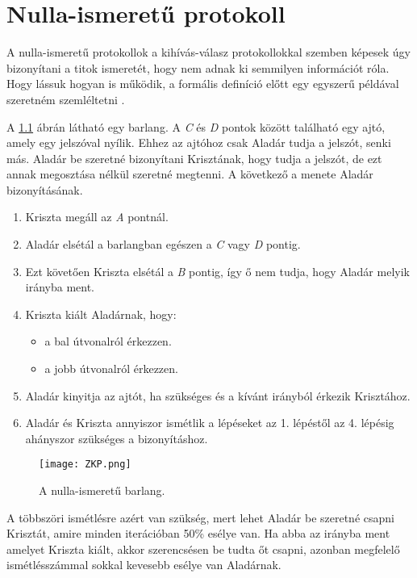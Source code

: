 \chapter{Nulla-ismeretű protokoll}

A nulla-ismeretű protokollok a kihívás-válasz protokollokkal szemben képesek úgy bizonyítani a titok ismeretét, hogy nem adnak ki semmilyen információt róla. Hogy lássuk hogyan is működik, a formális definíció előtt egy egyszerű példával szeretném szemléltetni \cite{ZKPToYourChildren, schneier2015applied}.

A \ref{Figure::ZKcave} ábrán látható egy barlang. A \textit{C} és \textit{D} pontok között található egy ajtó, amely egy jelszóval nyílik. Ehhez az ajtóhoz csak Aladár tudja a jelszót, senki más. Aladár be szeretné bizonyítani Krisztának, hogy tudja a jelszót, de ezt annak megosztása nélkül szeretné megtenni. A következő a menete Aladár bizonyításának.

\begin{enumerate}
    \item Kriszta megáll az \textit{A} pontnál.
    \item Aladár elsétál a barlangban egészen a \textit{C} vagy \textit{D} pontig.
    \item Ezt követően Kriszta elsétál a \textit{B} pontig, így ő nem tudja, hogy Aladár melyik irányba ment.
    \item Kriszta kiált Aladárnak, hogy:
        \begin{itemize}
            \item a bal útvonalról érkezzen.
            \item a jobb útvonalról érkezzen.
        \end{itemize}
    \item Aladár kinyitja az ajtót, ha szükséges és a kívánt irányból érkezik Krisztához.
    \item Aladár és Kriszta annyiszor ismétlik a lépéseket az 1. lépéstől az 4. lépésig ahányszor szükséges a bizonyításhoz.
\end{enumerate}

\begin{figure}[H]
    \centering
    \texttt{[image: ZKP.png]}
    \caption{A nulla-ismeretű barlang.}
    \label{Figure::ZKcave}
\end{figure}

A többszöri ismétlésre azért van szükség, mert lehet Aladár be szeretné csapni Krisztát, amire minden iterációban 50\% esélye van. Ha abba az irányba ment amelyet Kriszta kiált, akkor szerencsésen be tudta őt csapni, azonban megfelelő ismétlésszámmal sokkal kevesebb esélye van Aladárnak.

